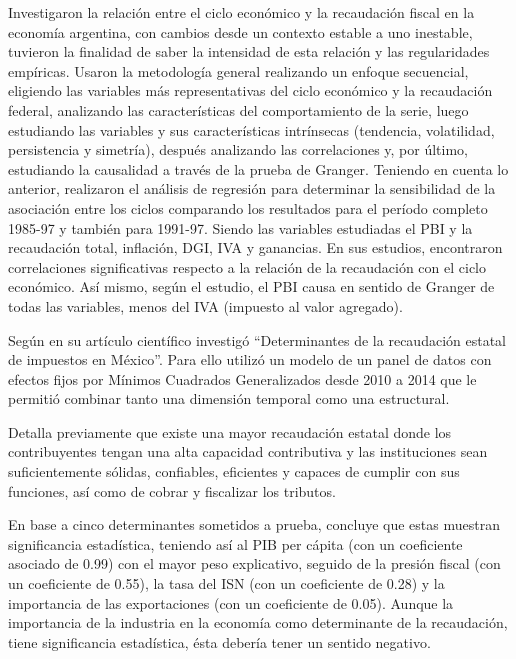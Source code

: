\documentclass[
  letterpaper,
  DIV=11,
  numbers=noendperiod]{scrartcl}
\begin{document}
\textcite{carrera_ciclo_1999} Investigaron la relación entre el ciclo
económico y la recaudación fiscal en la economía argentina, con cambios
desde un contexto estable a uno inestable, tuvieron la finalidad de
saber la intensidad de esta relación y las regularidades empíricas.
Usaron la metodología general realizando un enfoque secuencial,
eligiendo las variables más representativas del ciclo económico y la
recaudación federal, analizando las características del comportamiento
de la serie, luego estudiando las variables y sus características
intrínsecas (tendencia, volatilidad, persistencia y simetría), después
analizando las correlaciones y, por último, estudiando la causalidad a
través de la prueba de Granger. Teniendo en cuenta lo anterior,
realizaron el análisis de regresión para determinar la sensibilidad de
la asociación entre los ciclos comparando los resultados para el período
completo 1985-97 y también para 1991-97. Siendo las variables estudiadas
el PBI y la recaudación total, inflación, DGI, IVA y ganancias. En sus
estudios, encontraron correlaciones significativas respecto a la
relación de la recaudación con el ciclo económico. Así mismo, según el
estudio, el PBI causa en sentido de Granger de todas las variables,
menos del IVA (impuesto al valor agregado).

Según \textcite{tello_determinantes_2018} en su artículo científico
investigó ``Determinantes de la recaudación estatal de impuestos en
México''. Para ello utilizó un modelo de un panel de datos con efectos
fijos por Mínimos Cuadrados Generalizados desde 2010 a 2014 que le
permitió combinar tanto una dimensión temporal como una estructural.

Detalla previamente que existe una mayor recaudación estatal donde los
contribuyentes tengan una alta capacidad contributiva y las
instituciones sean suficientemente sólidas, confiables, eficientes y
capaces de cumplir con sus funciones, así como de cobrar y fiscalizar
los tributos.

En base a cinco determinantes sometidos a prueba, concluye que estas
muestran significancia estadística, teniendo así al PIB per cápita (con
un coeficiente asociado de 0.99) con el mayor peso explicativo, seguido
de la presión fiscal (con un coeficiente de 0.55), la tasa del ISN (con
un coeficiente de 0.28) y la importancia de las exportaciones (con un
coeficiente de 0.05). Aunque la importancia de la industria en la
economía como determinante de la recaudación, tiene significancia
estadística, ésta debería tener un sentido negativo.
\end{document}
